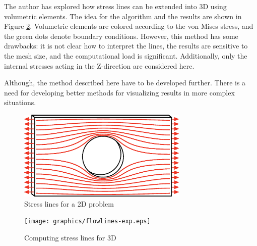The author  has explored how stress lines can be extended into 3D using volumetric elements.  The idea for the algorithm and the results are shown in Figure \ref{fig:flowlines-exp}. Volumetric elements are colored according to the von Mises stress, and the green dots denote boundary conditions. However, this method has some drawbacks: it is not clear how to interpret the lines, the results are sensitive to the mesh size, and the computational load is significant. Additionally, only the internal stresses acting in the Z-direction are considered here.

Although, the method described here have to be developed further. There is a need for developing better methods for visualizing results in more complex situations.

\begin{figure}
  \includegraphics[width=230pt]{graphics/stresslines.eps}
  \caption{Stress lines for a 2D problem}
  \label{fig:stresslines}
\end{figure}
 
\begin{figure}
  \texttt{[image: graphics/flowlines-exp.eps]}
  \caption{Computing stress lines for 3D}
  \label{fig:flowlines-exp}
\end{figure}
